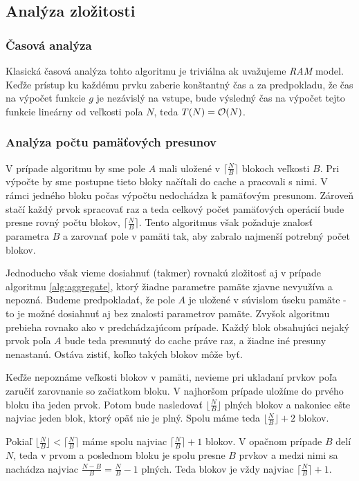 \subsection{Analýza zložitosti}
\subsubsection{Časová analýza}
Klasická časová analýza tohto algoritmu je triviálna ak uvažujeme \emph{RAM} model. Keďže prístup ku každému prvku  zaberie konštantný čas a za predpokladu, že čas na výpočet funkcie $g$ je nezávislý na vstupe, bude výsledný čas na výpočet tejto funkcie lineárny od veľkosti poľa $N$, teda $T(N) = \mathcal{O}(N)$.

\subsubsection{Analýza počtu pamäťových presunov}

V prípade \aware algoritmu by sme pole $A$ mali uložené v $\lceil \frac{N}{B} \rceil$ blokoch veľkosti $B$. Pri výpočte by sme postupne tieto bloky načítali do cache a pracovali s nimi. V rámci jedného bloku počas výpočtu nedochádza k pamäťovým presunom. Zároveň stačí každý prvok spracovať raz a teda celkový počet pamäťových operácií bude presne rovný počtu blokov, $\lceil \frac{N}{B} \rceil$. Tento algoritmus však požaduje znalosť parametra $B$ a zarovnať pole v pamäti tak, aby zabralo najmenší potrebný počet blokov.

Jednoducho však vieme dosiahnuť (takmer) rovnakú zložitosť aj v prípade \obliv algoritmu \ref{alg:aggregate}, ktorý žiadne parametre pamäte zjavne nevyužíva a nepozná. Budeme predpokladať, že pole $A$ je uložené v súvislom úseku pamäte - to je možné dosiahnuť aj bez znalosti parametrov pamäte. Zvyšok algoritmu prebieha rovnako ako v predchádzajúcom prípade. Každý blok obsahujúci nejaký prvok poľa $A$ bude teda presunutý do cache práve raz, a žiadne iné presuny nenastanú. Ostáva zistiť, koľko takých blokov môže byť.

Keďže nepoznáme veľkosti blokov v pamäti, nevieme pri ukladaní prvkov poľa zaručiť zarovnanie so začiatkom bloku. V najhoršom prípade uložíme do prvého bloku iba jeden prvok. Potom bude nasledovať $\lfloor \frac{N}{B} \rfloor$ plných blokov a nakoniec ešte najviac jeden blok, ktorý opäť nie je plný. Spolu máme teda $\lfloor \frac{N}{B} \rfloor + 2$ blokov.

Pokiaľ $\lfloor \frac{N}{B} \rfloor < \lceil \frac{N}{B} \rceil$ máme spolu najviac $\lceil \frac{N}{B} \rceil + 1$ blokov. V opačnom prípade $B$ delí $N$, teda v prvom a poslednom bloku je spolu presne $B$ prvkov a medzi nimi sa nachádza najviac $\frac{N-B}{B} = \frac{N}{B} - 1$ plných. Teda blokov je vždy najviac $\lceil \frac{N}{B} \rceil +1$.

